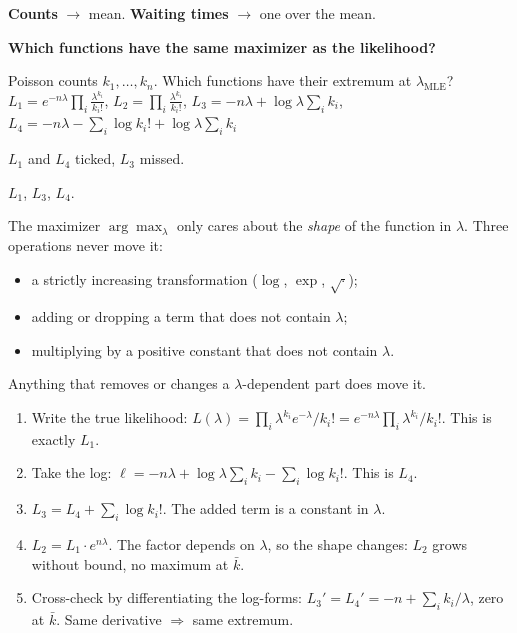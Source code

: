 \documentclass[11pt,a4paper]{article}
\newcommand{\ok}{\textcolor{rightc}{\ding{51}}}
\newcommand{\bad}{\textcolor{wrongc}{\ding{55}}}
\newcommand{\keep}[1]{\par
  \ifdim\dimexpr\pagegoal-\pagetotal\relax<#1\relax\newpage\fi}
\newcommand{\sub}[1]{\keep{6cm}\medskip
  {\sffamily\bfseries\large\color{accent}#1}\par\smallskip}
\begin{document}
\begin{hook}
\textbf{Counts} $\to$ mean. \textbf{Waiting times} $\to$ one over the mean.
\end{hook}

\sub{Which functions have the same maximizer as the likelihood?}

\begin{question}
Poisson counts $k_1,\dots,k_n$. Which functions have their extremum at
$\lambda_\text{MLE}$?\\[2pt]
$L_1=e^{-n\lambda}\prod_i\frac{\lambda^{k_i}}{k_i!}$,\quad
$L_2=\prod_i\frac{\lambda^{k_i}}{k_i!}$,\quad
$L_3=-n\lambda+\log\lambda\sum_ik_i$,\quad
$L_4=-n\lambda-\sum_i\log k_i!+\log\lambda\sum_ik_i$
\end{question}
\begin{yours}
$L_1$ and $L_4$ ticked, $L_3$ missed.
\end{yours}
\begin{correct}
$L_1$, $L_3$, $L_4$.
\end{correct}

\begin{why}
The maximizer $\arg\max_\lambda$ only cares about the \emph{shape} of the
function in $\lambda$. Three operations never move it:
\begin{itemize}[leftmargin=*]
  \item a strictly increasing transformation ($\log$, $\exp$, $\sqrt{\cdot}$);
  \item adding or dropping a term that does not contain $\lambda$;
  \item multiplying by a positive constant that does not contain $\lambda$.
\end{itemize}
Anything that removes or changes a $\lambda$-dependent part does move it.
\end{why}

\begin{steps}
\begin{enumerate}[leftmargin=*]
  \item Write the true likelihood: $L(\lambda)=\prod_i\lambda^{k_i}e^{-\lambda}/k_i!
        =e^{-n\lambda}\prod_i\lambda^{k_i}/k_i!$. This is exactly $L_1$. \ok
  \item Take the log: $\ell=-n\lambda+\log\lambda\sum_ik_i-\sum_i\log k_i!$. This
        is $L_4$. \ok
  \item $L_3=L_4+\sum_i\log k_i!$. The added term is a constant in $\lambda$. \ok
  \item $L_2=L_1\cdot e^{n\lambda}$. The factor depends on $\lambda$, so the shape
        changes: $L_2$ grows without bound, no maximum at $\bar k$. \bad
  \item Cross-check by differentiating the log-forms: $L_3'=L_4'=-n+\sum_ik_i/\lambda$,
        zero at $\bar k$. Same derivative $\Rightarrow$ same extremum.
\end{enumerate}
\end{steps}
\end{document}
